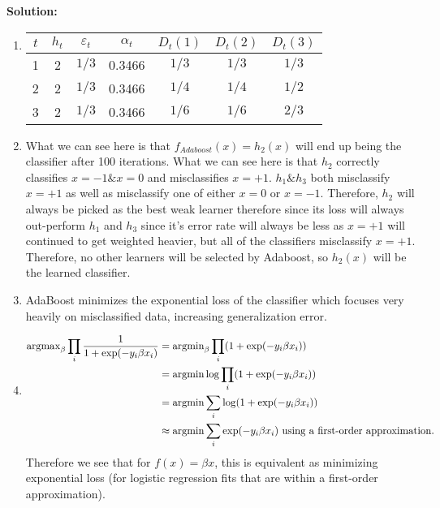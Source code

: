 \textbf{Solution:}

\begin{enumerate}[(1)]
    \item 
    \begin{tabular}{c|ccc|ccc}
    $t$ & $h_t$ & $\varepsilon_t$ & $\alpha_t$ & $D_{t}(1)$ & $D_{t}(2)$ & $D_{t}(3)$ \\ \hline
    1 & 2 & $1/3$ & 0.3466 & $ 1/3 $ & $ 1/3 $ & $ 1/3 $ \\
    2 & 2 & $1/3$ & 0.3466 & $ 1/4 $ & $ 1/4 $ & $ 1/2 $ \\
    3 & 2 & $1/3$ & 0.3466 & $ 1/6 $ & $ 1/6 $ & $ 2/3 $
    \end{tabular}
    
    \item What we can see here is that $f_{Adaboost}(x) = h_2(x)$ will end up being the classifier after 100 iterations. What we can see here is that $h_2$ correctly classifies $x = -1 \& x = 0$ and misclassifies $x = +1$. $h_1 \& h_3$ both misclassify $x = +1$ as well as misclassify one of either $x = 0$ or $x = -1$. Therefore, $h_2$ will always be picked as the best weak learner therefore since its loss will always out-perform $h_1$ and $h_3$ since it's error rate will always be less as $x = +1$ will continued to get weighted heavier, but all of the classifiers misclassify $x = +1$. Therefore, no other learners will be selected by Adaboost, so $h_2(x)$ will be the learned classifier.
    
    \item AdaBoost minimizes the exponential loss of the classifier which focuses very heavily on misclassified data, increasing generalization error. 
    
    \item 
    \begin{align*}
        \operatorname{argmax}_\beta \prod_i \frac{1}{1 + \exp(-y_i \beta x_i)} &= \operatorname{argmin}_\beta \prod_i (1 + \exp(-y_i \beta x_i)) \\
            &= \operatorname{argmin} \log \prod_i (1 + \exp(-y_i \beta x_i))\\
            &= \operatorname{argmin} \sum_i \log(1 + \exp(-y_i \beta x_i))\\
            &\approx \operatorname{argmin} \sum_i \exp(-y_i \beta x_i) ~\text{using a first-order approximation.}
    \end{align*}
    Therefore we see that for $f(x) = \beta x$, this is equivalent as minimizing exponential loss (for logistic regression fits that are within a first-order approximation).
    
    
\end{enumerate}